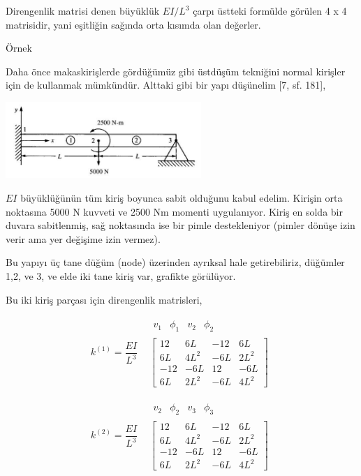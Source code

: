 \documentclass[12pt,fleqn]{article}\usepackage{../../common}
\begin{document}
Direngenlik matrisi denen büyüklük $EI / L^3$ çarpı üstteki formülde görülen
4 x 4 matrisidir, yani eşitliğin sağında orta kısımda olan değerler.

Örnek

Daha önce makaskirişlerde gördüğümüz gibi üstdüşüm tekniğini normal kirişler
için de kullanmak mümkündür. Alttaki gibi bir yapı düşünelim [7, sf. 181],

\includegraphics[width=20em]{phy_020_strs_06_01.jpg}

$EI$ büyüklüğünün tüm kiriş boyunca sabit olduğunu kabul edelim. Kirişin orta
noktasına 5000 N kuvveti ve 2500 Nm momenti uygulanıyor. Kiriş en solda bir
duvara sabitlenmiş, sağ noktasında ise bir pimle destekleniyor (pimler
dönüşe izin verir ama yer değişime izin vermez). 

Bu yapıyı üç tane düğüm (node) üzerinden ayrıksal hale getirebiliriz,
düğümler 1,2, ve 3, ve elde iki tane kiriş var, grafikte görülüyor.

Bu iki kiriş parçası için direngenlik matrisleri,

$$
k^{(1)} = \frac{EI}{L^3}
\begin{array}{cc} & \begin{array}{rrrr} v_1 & \phi_1 & v_2 & \phi_2 \end{array} \\ &
\left[
\begin{array}{cccc}
  12 & 6L & -12 & 6L \\
  6L & 4L^2 & -6L & 2L^2 \\
  -12 & -6L & 12 & -6L \\
  6L & 2L^2 & -6L & 4L^2
\end{array}
\right]
\end{array} 
$$

$$
k^{(2)} = \frac{EI}{L^3}
\begin{array}{cc} & \begin{array}{rrrr} v_2 & \phi_2 & v_3 & \phi_3 \end{array} \\ &
\left[
\begin{array}{cccc}
  12 & 6L & -12 & 6L \\
  6L & 4L^2 & -6L & 2L^2 \\
  -12 & -6L & 12 & -6L \\
  6L & 2L^2 & -6L & 4L^2
\end{array}
\right]
\end{array} 
$$
\end{document}
